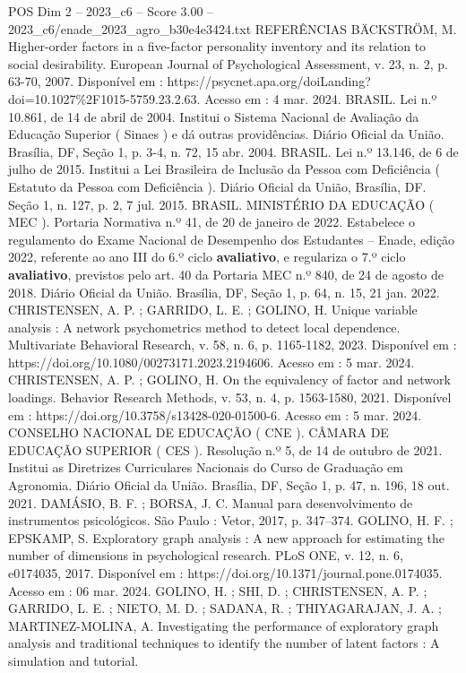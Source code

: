 \begin{textsample}{POS Dim 2 – 2023\_c6 – Score 3.00 – 2023\_c6/enade\_2023\_agro\_b30e4e3424.txt}
REFERÊNCIAS BÄCKSTRÖM, M.
Higher-order factors in a five-factor personality inventory and its relation to social desirability.
European Journal of Psychological Assessment, v. 23, n. 2, p. 63-70, 2007.
Disponível em : https://psycnet.apa.org/doiLanding? doi=10.1027\%2F1015-5759.23.2.63.
Acesso em : 4 mar. 2024.
BRASIL.
Lei n.º 10.861, de 14 de abril de 2004.
Institui o Sistema Nacional de Avaliação da Educação Superior ( Sinaes ) e dá outras providências.
Diário Oficial da União.
Brasília, DF, Seção 1, p. 3-4, n. 72, 15 abr. 2004.
BRASIL.
Lei n.º 13.146, de 6 de julho de 2015.
Institui a Lei Brasileira de Inclusão da Pessoa com Deficiência ( Estatuto da Pessoa com Deficiência ).
Diário Oficial da União, Brasília, DF.
Seção 1, n. 127, p. 2, 7 jul. 2015.
BRASIL.
MINISTÉRIO DA EDUCAÇÃO ( MEC ).
Portaria Normativa n.º 41, de 20 de janeiro de 2022.
Estabelece o regulamento do Exame Nacional de Desempenho dos Estudantes – Enade, edição 2022, referente ao ano III do 6.º ciclo \textbf{avaliativo}, e regulariza o 7.º ciclo \textbf{avaliativo}, previstos pelo art. 40 da Portaria MEC n.º 840, de 24 de agosto de 2018.
Diário Oficial da União.
Brasília, DF, Seção 1, p. 64, n. 15, 21 jan. 2022.
CHRISTENSEN, A.
P. ; GARRIDO, L.
E. ; GOLINO, H.
Unique variable analysis : A network psychometrics method to detect local dependence.
Multivariate Behavioral Research, v. 58, n. 6, p. 1165-1182, 2023.
Disponível em : https://doi.org/10.1080/00273171.2023.2194606.
Acesso em : 5 mar. 2024.
CHRISTENSEN, A.
P. ; GOLINO, H.
On the equivalency of factor and network loadings.
Behavior Research Methods, v. 53, n. 4, p. 1563-1580, 2021.
Disponível em : https://doi.org/10.3758/s13428-020-01500-6.
Acesso em : 5 mar. 2024.
CONSELHO NACIONAL DE EDUCAÇÃO ( CNE ).
CÂMARA DE EDUCAÇÃO SUPERIOR ( CES ).
Resolução n.º 5, de 14 de outubro de 2021.
Institui as Diretrizes Curriculares Nacionais do Curso de Graduação em Agronomia.
Diário Oficial da União.
Brasília, DF, Seção 1, p. 47, n. 196, 18 out. 2021.
DAMÁSIO, B.
F. ; BORSA, J.
C.
Manual para desenvolvimento de instrumentos psicológicos.
São Paulo : Vetor, 2017, p. 347–374.
GOLINO, H.
F. ; EPSKAMP, S.
Exploratory graph analysis : A new approach for estimating the number of dimensions in psychological research.
PLoS ONE, v. 12, n. 6, e0174035, 2017.
Disponível em : https://doi.org/10.1371/journal.pone.0174035.
Acesso em : 06 mar. 2024.
GOLINO, H. ; SHI, D. ; CHRISTENSEN, A.
P. ; GARRIDO, L.
E. ; NIETO, M.
D. ; SADANA, R. ; THIYAGARAJAN, J.
A. ; MARTINEZ-MOLINA, A.
Investigating the performance of exploratory graph analysis and traditional techniques to identify the number of latent factors : A simulation and tutorial.

\end{textsample}
